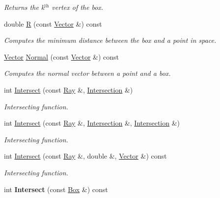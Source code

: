 \begin{DoxyCompactItemize}
\begin{DoxyCompactList}\small\item\em \-Returns the k$^{\mbox{th}}$  vertex of the box. \end{DoxyCompactList}\item 
\hypertarget{class_box_a913a6b1487999917a85d87b49b3c1c52}{
double \hyperlink{class_box_a913a6b1487999917a85d87b49b3c1c52}{\-R} (const \hyperlink{class_vector}{\-Vector} \&) const }
\label{class_box_a913a6b1487999917a85d87b49b3c1c52}

\begin{DoxyCompactList}\small\item\em \-Computes the minimum distance between the box and a point in space. \end{DoxyCompactList}\item 
\hypertarget{class_box_a80db61cd35cae3122fe658ac079495ee}{
\hyperlink{class_vector}{\-Vector} \hyperlink{class_box_a80db61cd35cae3122fe658ac079495ee}{\-Normal} (const \hyperlink{class_vector}{\-Vector} \&) const }
\label{class_box_a80db61cd35cae3122fe658ac079495ee}

\begin{DoxyCompactList}\small\item\em \-Computes the normal vector between a point and a box. \end{DoxyCompactList}\item 
int \hyperlink{class_box_a6ac204afbbdc851645f33df16104292a}{\-Intersect} (const \hyperlink{class_ray}{\-Ray} \&, \hyperlink{class_intersection}{\-Intersection} \&)
\begin{DoxyCompactList}\small\item\em \-Intersecting function. \end{DoxyCompactList}\item 
int \hyperlink{class_box_a53e6a5db3bcc420700f88e6759da805d}{\-Intersect} (const \hyperlink{class_ray}{\-Ray} \&, \hyperlink{class_intersection}{\-Intersection} \&, \hyperlink{class_intersection}{\-Intersection} \&)
\begin{DoxyCompactList}\small\item\em \-Intersecting function. \end{DoxyCompactList}\item 
int \hyperlink{class_box_a13633b69e0fa7b8e6ca35c5d0fc65a8a}{\-Intersect} (const \hyperlink{class_ray}{\-Ray} \&, double \&, \hyperlink{class_vector}{\-Vector} \&) const 
\begin{DoxyCompactList}\small\item\em \-Intersecting function. \end{DoxyCompactList}\item 
\hypertarget{class_box_ac5702737ae3929edb195e49d48abe25d}{
int {\bfseries \-Intersect} (const \hyperlink{class_box}{\-Box} \&) const }
\label{class_box_ac5702737ae3929edb195e49d48abe25d}


\end{DoxyCompactItemize}
